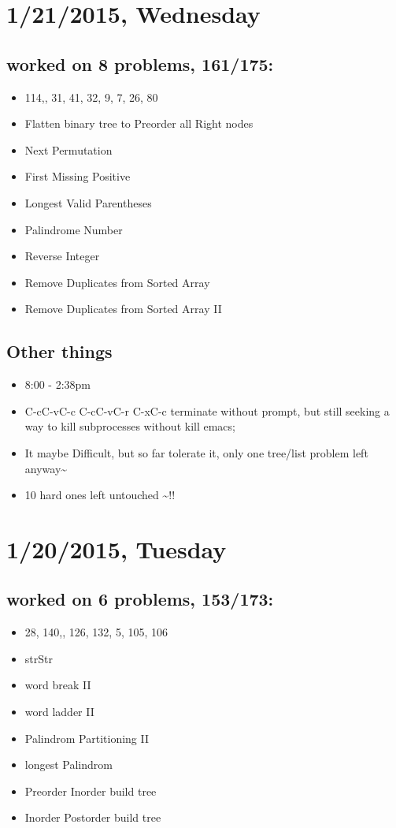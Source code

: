 \documentclass[9pt,b5paper]{article}
\begin{document}
\section{1/21/2015, Wednesday}
\label{sec-3}
\subsection{worked on 8 problems, 161/175:}
\label{sec-3-1}
\begin{itemize}
\item 114,, 31, 41, 32, 9, 7, 26, 80
\item Flatten binary tree to Preorder all Right nodes
\item Next Permutation
\item First Missing Positive
\item Longest Valid Parentheses
\item Palindrome Number
\item Reverse Integer
\item Remove Duplicates from Sorted Array
\item Remove Duplicates from Sorted Array II
\end{itemize}
\subsection{Other things}
\label{sec-3-2}
\begin{itemize}
\item 8:00 - 2:38pm
\item C-cC-vC-c C-cC-vC-r C-xC-c terminate without prompt, but still seeking a way to kill subprocesses without kill emacs;
\item It maybe Difficult, but so far tolerate it, only one tree/list problem left anyway\textasciitilde{}
\item 10 hard ones left untouched \textasciitilde{}!!
\end{itemize}
\section{1/20/2015, Tuesday}
\label{sec-4}
\subsection{worked on 6 problems, 153/173:}
\label{sec-4-1}
\begin{itemize}
\item 28, 140,, 126, 132, 5, 105, 106
\item strStr
\item word break II
\item word ladder II
\item Palindrom Partitioning II
\item longest Palindrom
\item Preorder Inorder build tree
\item Inorder Postorder build tree
\end{itemize}
\end{document}
